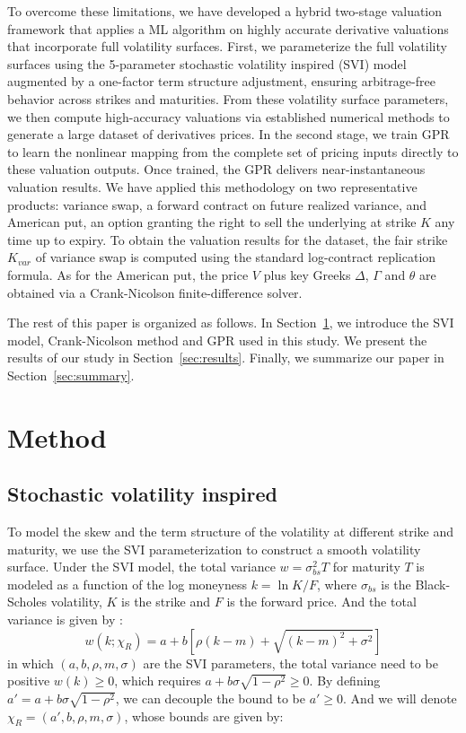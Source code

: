 \documentclass[%
 reprint,
 superscriptaddress,
nobibnotes,
 amsmath,amssymb,
 aps,
]{revtex4-2}
\begin{document}
To overcome these limitations, we have developed a hybrid two-stage valuation framework that applies a ML algorithm on highly accurate derivative valuations that incorporate full volatility surfaces. First, we parameterize the full volatility surfaces using the 5-parameter stochastic volatility inspired (SVI) model\cite{gatheral2011volatility, gatheral2014arbitrage} augmented by a one-factor term structure adjustment, ensuring arbitrage-free behavior across strikes and maturities. From these volatility surface parameters, we then compute high-accuracy valuations via established numerical methods to generate a large dataset of derivatives prices. In the second stage, we train GPR\cite{williams2006gaussian} to learn the nonlinear mapping from the complete set of pricing inputs directly to these valuation outputs. Once trained, the GPR delivers near-instantaneous valuation results. We have applied this methodology on two representative products: variance swap, a forward contract on future realized variance, and American put, an option granting the right to sell the underlying at strike $K$ any time up to expiry. To obtain the valuation results for the dataset, the fair strike $K_{var}$ of variance swap is computed using the standard log-contract replication formula\cite{demeterfi1999more}. As for the American put, the price $V$ plus key Greeks $\Delta$, $\Gamma$ and $\theta$ are obtained via a Crank-Nicolson finite-difference solver. 

The rest of this paper is organized as follows. In Section~\ref{sec:method}, we introduce the SVI model, Crank-Nicolson method and GPR used in this study. We present the results of our study in Section~\ref{sec:results}. Finally, we summarize our paper in Section~\ref{sec:summary}.


\section{Method}
\label{sec:method}

\subsection{Stochastic volatility inspired}
To model the skew and the term structure of the volatility at different strike and maturity, we use the SVI parameterization to construct a smooth volatility surface. Under the SVI model, the total variance $w=\sigma^2_{bs}T$ for maturity $T$ is modeled as a function of the log moneyness $k=\ln{K/F}$, where $\sigma_{bs}$ is the Black-Scholes volatility, $K$ is the strike and $F$ is the forward price. And the total variance is given by \cite{gatheral2014arbitrage}:
\begin{equation}
w(k;\chi_R) = a + b\left[ \rho (k-m) + \sqrt{(k-m)^2 +\sigma^2}\right]
\label{equ: SVI parameterization}
\end{equation}
in which $(a,b,\rho,m,\sigma)$ are the SVI parameters, the total variance need to be positive $w(k)\geq 0$, which requires $a+b\sigma\sqrt{1-\rho^2} \geq 0$. By defining $a' = a + b\sigma\sqrt{1-\rho^2}$, we can decouple the bound to be $a' \geq 0$. And we will denote $\chi_R = (a',b,\rho,m,\sigma)$, whose bounds are given by:
\end{document}
